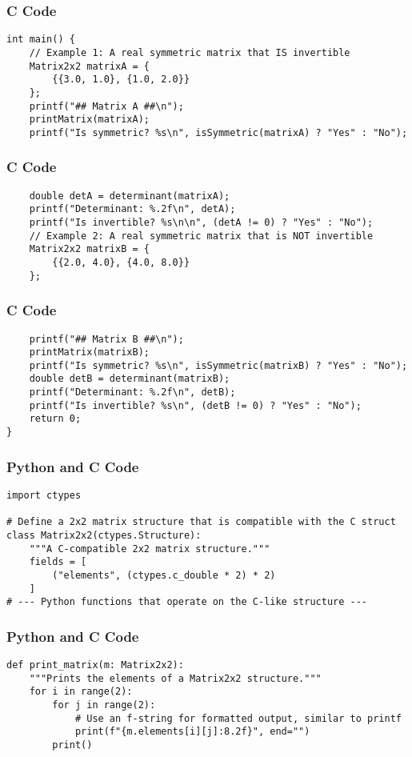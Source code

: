 \documentclass{beamer}
\begin{document}
\begin{frame}[fragile]
\frametitle{C Code}
\begin{lstlisting}
int main() {
    // Example 1: A real symmetric matrix that IS invertible
    Matrix2x2 matrixA = {
        {{3.0, 1.0}, {1.0, 2.0}}
    };
    printf("## Matrix A ##\n");
    printMatrix(matrixA);
    printf("Is symmetric? %s\n", isSymmetric(matrixA) ? "Yes" : "No");
\end{lstlisting}
\end{frame}

\begin{frame}[fragile]
\frametitle{C Code}
\begin{lstlisting}
    double detA = determinant(matrixA);
    printf("Determinant: %.2f\n", detA);
    printf("Is invertible? %s\n\n", (detA != 0) ? "Yes" : "No");
    // Example 2: A real symmetric matrix that is NOT invertible
    Matrix2x2 matrixB = {
        {{2.0, 4.0}, {4.0, 8.0}}
    };
\end{lstlisting}
\end{frame}

\begin{frame}[fragile]
\frametitle{C Code}
\begin{lstlisting}
    printf("## Matrix B ##\n");
    printMatrix(matrixB);
    printf("Is symmetric? %s\n", isSymmetric(matrixB) ? "Yes" : "No");
    double detB = determinant(matrixB);
    printf("Determinant: %.2f\n", detB);
    printf("Is invertible? %s\n", (detB != 0) ? "Yes" : "No");
    return 0;
}
\end{lstlisting}
\end{frame}

\begin{frame}[fragile]
\frametitle{Python and C Code}
\begin{lstlisting}
import ctypes

# Define a 2x2 matrix structure that is compatible with the C struct
class Matrix2x2(ctypes.Structure):
    """A C-compatible 2x2 matrix structure."""
    fields = [
        ("elements", (ctypes.c_double * 2) * 2)
    ]
# --- Python functions that operate on the C-like structure ---
\end{lstlisting}
\end{frame}

\begin{frame}[fragile]
\frametitle{Python and C Code}
\begin{lstlisting}
def print_matrix(m: Matrix2x2):
    """Prints the elements of a Matrix2x2 structure."""
    for i in range(2):
        for j in range(2):
            # Use an f-string for formatted output, similar to printf
            print(f"{m.elements[i][j]:8.2f}", end="")
        print()
\end{lstlisting}
\end{frame}
\end{document}
